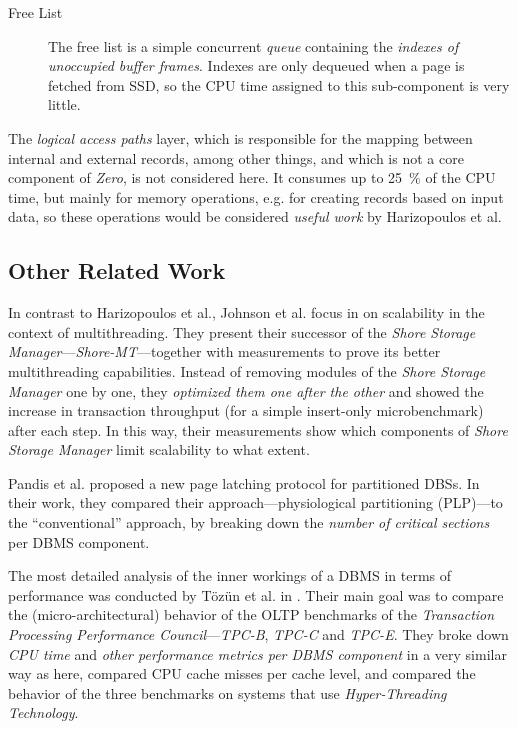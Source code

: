 \begin{description}
\begin{description}
                            \item[Free List]    The free list is a simple concurrent \emph{queue} containing the \emph{indexes of unoccupied buffer frames}. Indexes are only dequeued when a page is fetched from SSD, so the CPU time assigned to this sub-component is very little.
                        \end{description}
\end{description}

    The \emph{logical access paths} layer, which is responsible for the mapping between internal and external records, among other things, and which is not a core component of \textit{Zero}, is not considered here. It consumes up to \SI{25}{\percent} of the CPU time, but mainly for memory operations, e.g. for creating records based on input data, so these operations would be considered \emph{useful work} by Harizopoulos et al.

\subsection{Other Related Work} \label{subsec:looking_glass_related_work}

    In contrast to Harizopoulos et al., Johnson et al. focus in \cite{Johnson:2009} on scalability in the context of multithreading. They present their successor of the \emph{Shore Storage Manager}---\textit{Shore-MT}---together with measurements to prove its better multithreading capabilities. Instead of removing modules of the \textit{Shore Storage Manager} one by one, they \emph{optimized them one after the other} and showed the increase in transaction throughput (for a simple insert-only microbenchmark) after each step. In this way, their measurements show which components of \textit{Shore Storage Manager} limit scalability to what extent.

    Pandis et al. proposed a new page latching protocol for partitioned DBSs. In their work, they compared their approach---physiological partitioning (PLP)---to the ``conventional'' approach, by breaking down the \emph{number of critical sections} per DBMS component.

    The most detailed analysis of the inner workings of a DBMS in terms of performance was conducted by Tözün et al. in \cite{Tozun:2013}. Their main goal was to compare the (micro-architectural) behavior of the OLTP benchmarks of the \emph{Transaction Processing Performance Council}---\textit{TPC-B}, \textit{TPC-C} and \textit{TPC-E}. They broke down \emph{CPU time} and \emph{other performance metrics per DBMS component} in a very similar way as here, compared CPU cache misses per cache level, and compared the behavior of the three benchmarks on systems that use \emph{Hyper-Threading Technology}.

